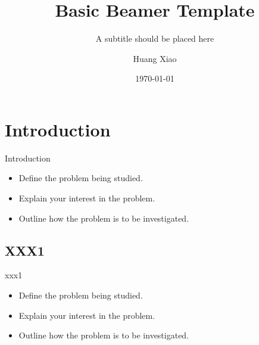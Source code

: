 \documentclass{beamer}
\begin{document}
\title{Basic Beamer Template}
\subtitle{A subtitle should be placed here}
\author{Huang Xiao} %

\date{\today}
\maketitle



\section{Introduction}

\begin{frame}{Introduction}

\begin{itemize}
\item Define the problem being studied.
\item Explain your interest in the problem.
\item Outline how the problem is to be investigated.
\end{itemize}

\end{frame}
\subsection{XXX1}
\begin{frame}{xxx1}

\begin{itemize}
\item Define the problem being studied.
\item Explain your interest in the problem.
\item Outline how the problem is to be investigated.
\end{itemize}

\end{frame}
\end{document}
